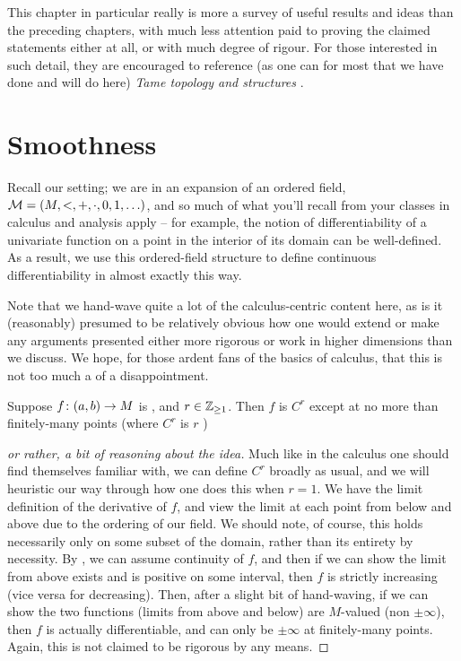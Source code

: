 \medskip

This chapter in particular really is more a survey of useful results and ideas than the preceding chapters, with much less attention paid to proving the claimed statements either at all, or with much degree of rigour. For those interested in such detail, they are encouraged to reference (as one can for most that we have done and will do here) \emph{Tame topology and \Om structures} \cite{dries_tame_1998}.

\section{Smoothness}
Recall our setting; we are in an \om expansion of an ordered field, $\mathcal{M} = (M, <, +, \cdot, 0, 1, \hdots)$, and so much of what you'll recall from your classes in calculus and analysis apply -- for example, the notion of differentiability of a univariate function on a point in the interior of its domain can be well-defined. As a result, we use this ordered-field structure to define continuous differentiability in almost exactly this way.

\begin{svgraybox}
  Note that we hand-wave quite a lot of the calculus-centric content here, as is it (reasonably) presumed to be relatively obvious how one would extend or make any arguments presented either more rigorous or work in higher dimensions than we discuss. We hope, for those ardent fans of the basics of calculus, that this is not too much a of a disappointment.
\end{svgraybox}


\begin{theorem}
  Suppose $f \colon (a, b) \to M$ is , and $r \in \mathbb{Z}_{\geq 1}$. Then $f$ is $C^{r}$ except at no more than finitely-many points (where $C^r$ is $r$ \contdfblty)
  \label{thm:cont_diff}
\end{theorem}

\begin{proof}[or rather, a bit of reasoning about the idea]
Much like in the calculus one should find themselves familiar with, we can define $C^r$ broadly as usual, and we will heuristic our way through how one does this when $r=1$. We have the limit definition of the derivative of $f$, and view the limit at each point from below and above due to the ordering of our field. We should note, of course, this holds necessarily only on some subset of the domain, rather than its entirety by necessity. By \Mt, we can assume continuity of $f$, and then if we can show the limit from above exists and is positive on some interval, then $f$ is strictly increasing (vice versa for decreasing). Then, after a slight bit of hand-waving, if we can show the two functions (limits from above and below) are $M$-valued (non $\pm \infty$), then $f$ is actually differentiable, and can only be $\pm \infty$ at finitely-many points. Again, this is not claimed to be rigorous by any means.
\end{proof}

